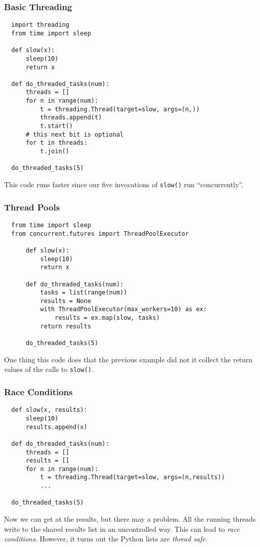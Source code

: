 \documentclass[10pt]{beamer}
\begin{document}
\begin{frame}[fragile]
  \frametitle{Basic Threading}
  
  
  \begin{verbatim}
  import threading
  from time import sleep
  
  def slow(x):
      sleep(10)
      return x
  
  def do_threaded_tasks(num):
      threads = []
      for n in range(num):
          t = threading.Thread(target=slow, args=(n,))
          threads.append(t)
          t.start()
      # this next bit is optional
      for t in threads:
          t.join()    
                  
  do_threaded_tasks(5)      
  \end{verbatim}
  This code runs faster since our five invocations of \texttt{slow()} 
  run ``concurrently''.
    
  \end{frame}
  
\begin{frame}[fragile]
  \frametitle{Thread Pools}
  
  \begin{verbatim}
  from time import sleep
  from concurrent.futures import ThreadPoolExecutor
  
      def slow(x):
          sleep(10)
          return x
          
      def do_threaded_tasks(num):
          tasks = list(range(num))
          results = None
          with ThreadPoolExecutor(max_workers=10) as ex:
              results = ex.map(slow, tasks)
          return results
              
      do_threaded_tasks(5)  
  \end{verbatim} 
  
  One thing this code does that the previous example did not it collect the
  return values of the calls to \texttt{slow()}.   
  \end{frame}
  
\begin{frame}[fragile]
  \frametitle{Race Conditions}
  
  \begin{verbatim}
  def slow(x, results):
      sleep(10)
      results.append(x)
  
  def do_threaded_tasks(num):
      threads = []
      results = []
      for n in range(num):
          t = threading.Thread(target=slow, args=(n,results))
          ...
                            
  do_threaded_tasks(5)      
  \end{verbatim}
  Now we can get at the results, but there may a problem. All the running 
  threads write to the shared results list in an uncontrolled way. This can lead to 
  \emph{race conditions}. However, it turns out the Python lists are \emph{thread safe}.
    
  \end{frame}
\end{document}

